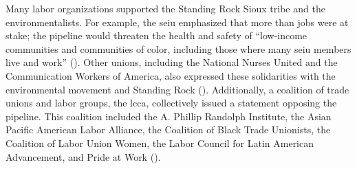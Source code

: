 


Many labor organizations supported the Standing Rock Sioux tribe and the environmentalists. For example, the \acrfull{seiu} emphasized that more than jobs were at stake; the pipeline would threaten the health and safety of “low-income communities and communities of color, including those where many \acrshort{seiu} members live and work” (\cite{nlfUnionsWeighDakota2016}). Other unions, including the National Nurses United and the Communication Workers of America, also expressed these solidarities with the environmental movement and Standing Rock (\cite{nlfUnionsWeighDakota2016}). Additionally, a coalition of trade unions and labor groups, the \acrfull{lcca}, collectively issued a statement opposing the pipeline. This coalition included the A. Phillip Randolph Institute, the Asian Pacific American Labor Alliance, the Coalition of Black Trade Unionists, the Coalition of Labor Union Women, the Labor Council for Latin American Advancement, and Pride at Work (\cite{apalaAFLCIOConstituencyGroups2016}).



